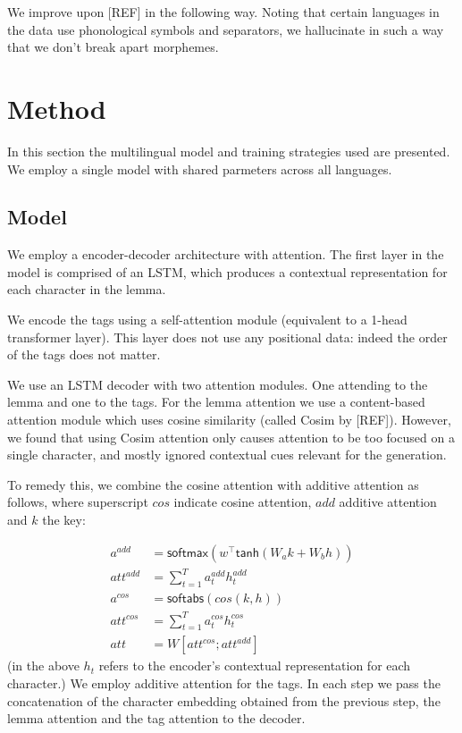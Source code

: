 \documentclass[11pt,a4paper]{article}
\begin{document}
We improve upon [REF] in the following way.
Noting that certain languages in the data use phonological symbols
and separators, we hallucinate in such a way that we don't break apart
morphemes.%


\section{Method}

In this section the multilingual model and training strategies used
are presented. We employ a single model with shared parmeters
across all languages. 

\subsection{Model}

We employ a encoder-decoder architecture with attention. The first
layer in the model is comprised of an LSTM, which produces a
contextual representation for each character in the lemma.

We encode the tags using a self-attention module (equivalent to a
1-head transformer layer).  This layer does not use any positional
data: indeed the order of the tags does not matter.

We use an LSTM decoder with two attention modules. One attending to
the lemma and one to the tags. For the lemma attention we use a
content-based attention module which uses cosine similarity (called
Cosim by [REF]).  However, we found that using Cosim attention only
causes attention to be too focused on a single character, and mostly
ignored contextual cues relevant for the generation.

To remedy this, we combine the cosine attention with additive
attention as follows, where superscript $cos$ indicate cosine attention,
$add$ additive attention and $k$ the key:

\begin{align*}
	a^{add} & = \mathsf{softmax}(w^\top\mathsf{tanh}(W_ak + W_bh))\\
	att^{add} & = \sum_{t=1}^{T}a_t^{add}h_t^{add}\\
	a^{cos} & = \mathsf{softabs}(cos(k,h))\\
	att^{cos} & = \sum_{t=1}^{T}a_t^{cos}h_t^{cos}\\
	att & = W[att^{cos}; att^{add}]
\end{align*}
(in the above $h_t$ refers to the encoder's contextual representation for each character.)
We employ additive attention for the tags. In each step we pass the
concatenation of the character embedding obtained from the previous
step, the lemma attention and the tag attention to the decoder.
\end{document}
